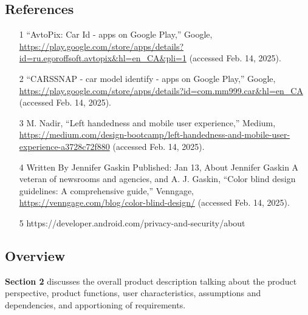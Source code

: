 \documentclass[]{article}
\begin{document}
\subsection{References}
\label{sub:references}

\begin{itemize}
    \item[1] “AvtoPix: Car Id - apps on Google Play,” Google, \url{https://play.google.com/store/apps/details?id=ru.egoroffsoft.avtopix&hl=en_CA&pli=1} (accessed Feb. 14, 2025).
    \item[2] “CARSSNAP - car model identify - apps on Google Play,” Google, \url{https://play.google.com/store/apps/details?id=com.mm999.car&hl=en_CA} (accessed Feb. 14, 2025).
    \item[3] M. Nadir, “Left handedness and mobile user experience,” Medium, \url{https://medium.com/design-bootcamp/left-handedness-and-mobile-user-experience-a3728c72f880} (accessed Feb. 14, 2025).
    \item[4] Written By Jennifer Gaskin  Published: Jan 13, About Jennifer Gaskin      	A veteran of newsrooms and agencies, and A. J. Gaskin, “Color blind design guidelines: A comprehensive guide,” Venngage, \url{https://venngage.com/blog/color-blind-design/} (accessed Feb. 14, 2025).
    \item[5] https://developer.android.com/privacy-and-security/about 
\end{itemize}


\subsection{Overview}
\label{sub:overview}

\textbf{Section 2} discusses the overall product description talking about the product perspective, product functions, user characteristics, assumptions and dependencies, and apportioning of requirements. 
\end{document}
